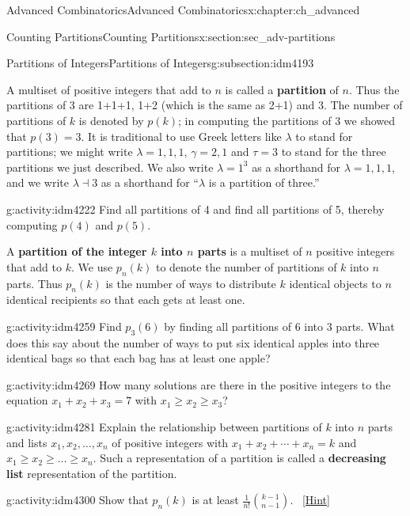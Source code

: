\documentclass[oneside,10pt,]{book}
\newcommand{\terminology}[1]{\textbf{#1}}
\numberwithin{equation}{chapter}
\begin{document}
\begin{chapterptx}{Advanced Combinatorics}{}{Advanced Combinatorics}{}{}{x:chapter:ch_advanced}
\begin{sectionptx}{Counting Partitions}{}{Counting Partitions}{}{}{x:section:sec_adv-partitions}
\begin{subsectionptx}{Partitions of Integers}{}{Partitions of Integers}{}{}{g:subsection:idm4193}
\par
A multiset of positive integers that add to \(n\) is called a \terminology{partition} of \(n\). Thus the partitions of 3 are 1+1+1, 1+2 (which is the same as 2+1) and 3. The number of partitions of \(k\) is denoted by \(p(k)\); in computing the partitions of 3 we showed that \(p(3) = 3\). It is traditional to use Greek letters like \(\lambda\) to stand for partitions; we might write \(\lambda = 1,1,1\), \(\gamma= 2,1\) and \(\tau = 3\) to stand for the three partitions we just described. We also write \(\lambda = 1^3\) as a shorthand for \(\lambda = 1,1,1\), and we write \(\lambda \dashv 3\) as a shorthand for ``\(\lambda\) is a partition of three.''%
\begin{activity}{}{g:activity:idm4222}%
Find all partitions of 4 and find all partitions of 5, thereby computing \(p(4)\) and \(p(5)\).%
\end{activity}
A \terminology{partition of the integer \(k\) into \(n\) parts} is a multiset of \(n\) positive integers that add to \(k\). We use \(p_n(k)\) to denote the number of partitions of \(k\) into \(n\) parts. Thus \(p_n(k)\) is the number of ways to distribute \(k\) identical objects to \(n\) identical recipients so that each gets at least one.%
\begin{activity}{}{g:activity:idm4259}%
Find \(p_3(6)\) by finding all partitions of 6 into 3 parts. What does this say about the number of ways to put six identical apples into three identical bags so that each bag has at least one apple?%
\end{activity}
\begin{activity}{}{g:activity:idm4269}%
How many solutions are there in the positive integers to the equation \(x_1+x_2+x_3 =7\) with \(x_1\ge x_2\ge x_3\)?%
\end{activity}
\begin{activity}{}{g:activity:idm4281}%
Explain the relationship between partitions of \(k\) into \(n\) parts and lists \(x_1,x_2,\ldots,x_n\) of positive integers with \(x_1 + x_2 + \cdots + x_n = k\) and \(x_1\ge x_2\ge\ldots \ge x_n\). Such a representation of a partition is called a \terminology{decreasing list} representation of the partition.%
\end{activity}
\begin{activity}{}{g:activity:idm4300}%
Show that \(p_n(k)\) is at least \(\frac{1}{n!}\binom{k-1}{n-1}\).%
\qquad~\hfill{\tiny\hyperlink{g:hint:idm4305-back}{[Hint]}}\end{activity}

\end{subsectionptx}
\end{sectionptx}
\end{chapterptx}
\end{document}
